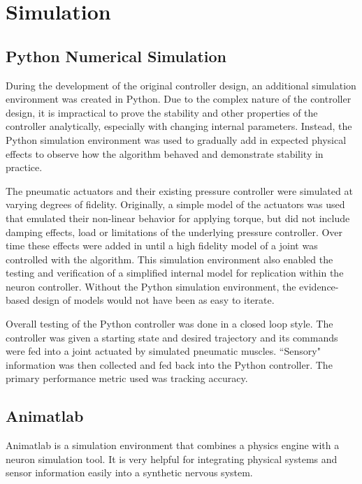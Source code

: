 \section{Simulation}

\subsection{Python Numerical Simulation}

During the development of the original controller design, an additional
simulation environment was created in Python. Due to the complex nature of
the controller design, it is impractical to prove the stability and other
properties of the controller analytically, especially with changing internal
parameters. Instead, the Python simulation environment was used to gradually add
in expected physical effects to observe how the algorithm behaved and demonstrate
stability in practice.

The pneumatic actuators and their existing pressure controller were simulated 
at varying degrees of fidelity. Originally, a simple model of the actuators
was used that emulated their non-linear behavior for applying torque, but did not
include damping effects, load or limitations of the underlying pressure
controller. Over time these effects were added in until a high fidelity model of
a joint was controlled with the algorithm. This simulation environment also
enabled the testing and verification of a simplified internal model for
replication within the neuron controller. Without the Python simulation
environment, the evidence-based design of models would not have been as easy to
iterate.

Overall testing of the Python controller was done in a closed loop style. The controller was given a starting state and desired trajectory and its commands were fed into a joint actuated by simulated pneumatic muscles. ``Sensory" information was then collected and fed back into the Python controller. The primary performance metric used was tracking accuracy. 

\subsection{Animatlab}

Animatlab is a simulation environment that combines a physics engine with a
neuron simulation tool. It is very helpful for integrating physical systems
and sensor information easily into a synthetic nervous system.

